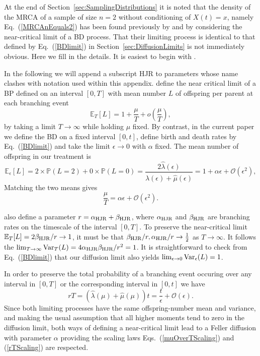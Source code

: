 \documentclass[preprint,12pt]{elsarticle}
\begin{document}
At the end of Section~\ref{sec:SamplingDistributions} it is noted that the density of the MRCA of a sample of size $n = 2$ without 
conditioning of $X(t) = x$, namely Eq.~(\ref{MRCAnEquals2}) has been found previously by \citet{o1995genealogy} and \cite{Harris20} 
by considering the near-critical limit of a BD process.  That their limiting process is identical to that defined by Eq.~(\ref{BDlimit}) in 
Section~\ref{sec:DiffusionLimits} is not immediately obvious.  Here we fill in the details.  It is easiest to begin with \cite{Harris20}.  

In the following we will append a subscript HJR to parameters whose name clashes with notation used within this appendix.   
\cite{Harris20} define the near critical limit of a BP defined on an interval $[0, T]$ with mean number $L$ of offspring per parent at 
each branching event 
\[
\mathbb{E}_T[L] = 1 + \frac{\mu}{T} + o\left(\frac{\mu}{T}\right), 
\]
by taking a limit $T \to \infty$ while holding $\mu$ fixed.  By contrast, in the current paper we define the BD on a fixed interval $[0, t]$, 
define birth and death rates by Eq.~(\ref{BDlimit}) and take the limit $\epsilon \to 0$ with $\alpha$ fixed.  The mean number of offspring in our treatment is 
\[
\mathbb{E}_\epsilon[L] = 2 \times \mathbb{P}(L = 2) + 0\times \mathbb{P}(L = 0) = \frac{2\hat{\lambda}(\epsilon)}{\hat{\lambda}(\epsilon) + \hat{\mu}(\epsilon)} 
							= 1 + \alpha\epsilon + \mathcal{O}(\epsilon^2), 
\]
Matching the two means gives 
\begin{equation} \label{muOverTScaling}
\frac{\mu}{T} = \alpha\epsilon + \mathcal{O}(\epsilon^2).  
\end{equation}

\cite{Harris20} also define a parameter $r = \alpha_{\rm HJR} + \beta_{\rm HJR}$, where $\alpha_{\rm HJR}$ and $\beta_{\rm HJR}$ are branching rates on 
the timescale of the interval $[0, T]$.  To preserve the near-critical limit  
$\mathbb{E}_T[L] = 2\beta_{\rm HJR}/r \to 1$, it must be that $\beta_{\rm HJR}/r, \alpha_{\rm HJR}/r \to \tfrac{1}{2}$ as $T \to \infty$.    
It  follows the $\lim_{T \to \infty}{\rm Var}_T(L) = 4 \alpha_{\rm HJR} \beta_{\rm HJR}/r^2 = 1$.  
It is straightforward to check from Eq.~(\ref{BDlimit}) that our diffusion limit also yields $\lim_{\epsilon \to 0}{\rm Var}_\epsilon(L) = 1$.  

In order to preserve the total probability of a branching event occuring over any interval in $[0, T]$ or the corresponding interval in $[0, t]$ we have 
\begin{equation}	\label{rTScaling}
rT = (\hat{\lambda}(\mu) + \hat{\mu}(\mu)) t = \frac{t}{\epsilon} + \mathcal{O}(\epsilon).  
\end{equation}
Since both limiting processes have the same offspring-number mean and variance, and making the usual assumption 
that all higher moments tend to zero in the diffusion limit, both ways of defining a near-critical limit lead to a Feller diffusion with parameter $\alpha$ 
providing the scaling laws Eqs.~(\ref{muOverTScaling}) and (\ref{rTScaling}) are respected.  
\end{document}
